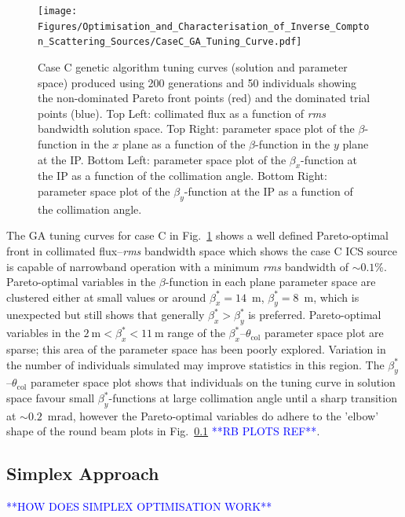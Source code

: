 \documentclass[../main.tex]{subfiles}
\begin{document}
\begin{figure}[!h]
\centering
\texttt{[image: Figures/Optimisation\_and\_Characterisation\_of\_Inverse\_Compton\_Scattering\_Sources/CaseC\_GA\_Tuning\_Curve.pdf]}
\caption{Case C genetic algorithm tuning curves (solution and parameter space) produced using 200 generations and 50 individuals showing the non-dominated Pareto front points (red) and the dominated trial points (blue). Top Left: collimated flux as a function of \textit{rms} bandwidth solution space. Top Right: parameter space plot of the $\beta$-function in the $x$ plane as a function of the $\beta$-function in the $y$ plane at the IP. Bottom Left: parameter space plot of the $\beta_{x}$-function at the IP as a function of the collimation angle. Bottom Right: parameter space plot of the $\beta_{y}$-function at the IP as a function of the collimation angle.}
\label{fig:case_C_GA_tuning_curves}
\end{figure}

The GA tuning curves for case C in Fig.~\ref{fig:case_C_GA_tuning_curves} shows a well defined Pareto-optimal front in collimated flux--\textit{rms} bandwidth space which shows the case C ICS source is capable of narrowband operation with a minimum \textit{rms} bandwidth of $\sim0.1$\%. Pareto-optimal variables in the $\beta$-function in each plane parameter space are clustered either at small values or around $\beta_{x}^{*} = 14$~\si{\meter}, $\beta_{y}^{*} = 8$~\si{\meter}, which is unexpected but still shows that generally $\beta_{x}^{*}>\beta_{y}^{*}$ is preferred. Pareto-optimal variables in the $2\mathrm{~\si{\meter}} < \beta_{x}^{*} < 11\mathrm{~\si{\meter}}$ range of the $\beta_{x}^{*}$--$\theta_{\mathrm{col}}$ parameter space plot are sparse; this area of the parameter space has been poorly explored. Variation in the number of individuals simulated may improve statistics in this region. The $\beta_{y}^{*}$--$\theta_{\mathrm{col}}$ parameter space plot shows that individuals on the tuning curve in solution space favour small $\beta_{y}^{*}$-functions at large collimation angle until a sharp transition at $\sim0.2$~\si{\milli\radian}, however the Pareto-optimal variables do adhere to the 'elbow' shape of the round beam plots in Fig.~\ref{} \textcolor{blue}{**RB PLOTS REF**}.   

\subsection{Simplex Approach}

\textcolor{blue}{**HOW DOES SIMPLEX OPTIMISATION WORK**}
\end{document}
